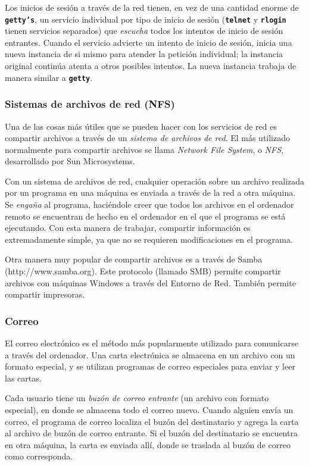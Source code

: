 \documentclass[12pt]{article}
\begin{document}
\begin{}
 Los inicios de sesión a través de la red tienen, en vez de una cantidad
enorme de \texttt{\textbf{getty's}}, un servicio individual por tipo de inicio de sesión (\texttt{\textbf{telnet}} y \texttt{\textbf{rlogin}}
tienen servicios separados) que \textit{escucha} todos los intentos de inicio de
sesión entrantes. Cuando el servicio advierte un intento de inicio de sesión,
inicia una nueva instancia de si mismo para atender la petición individual; la
instancia original continúa atenta a otros posibles intentos. La nueva instancia
trabaja de manera similar a \texttt{\textbf{getty}}.  




\subsubsection{ Sistemas de archivos de red (NFS)}  Una de las cosas
más útiles que se pueden hacer con los servicios de red es compartir archivos a
través de un \textit{sistema de archivos de red}. El más utilizado
normalmente para compartir archivos se llama \textit{Network File
System}, o \textit{NFS}, desarrollado por Sun
Microsystems.  

 Con un sistema de archivos de red, cualquier operación sobre un archivo
realizada por un programa en una máquina es enviada a través de la red a otra
máquina. Se \textit{engaña} al programa, haciéndole creer que todos los archivos en el
ordenador remoto se encuentran de hecho en el ordenador en el que el programa se
está ejecutando. Con esta manera de trabajar, compartir información es
extremadamente simple, ya que no se requieren modificaciones en el programa.


 Otra manera muy popular de compartir archivos es a través de Samba
(http://www.samba.org). Este protocolo
(llamado SMB) permite compartir archivos con máquinas Windows a través del
Entorno de Red. También permite compartir impresoras.  



\subsubsection{ Correo}

 El correo electrónico es el método más popularmente utilizado para
comunicarse a través del ordenador. Una carta electrónica se almacena en un
archivo con un formato especial, y se utilizan programas de correo especiales
para enviar y leer las cartas.  

 Cada usuario tiene un \textit{buzón de correo entrante} (un
archivo con formato especial), en donde se almacena todo el correo nuevo. Cuando
alguien  envía un correo, el programa de correo localiza el buzón del
destinatario y agrega la carta al archivo de buzón de correo entrante. Si el
buzón del destinatario se encuentra en otra máquina, la carta es enviada allí,
donde se traslada al buzón de correo como corresponda.  


\end{}
\end{document}
